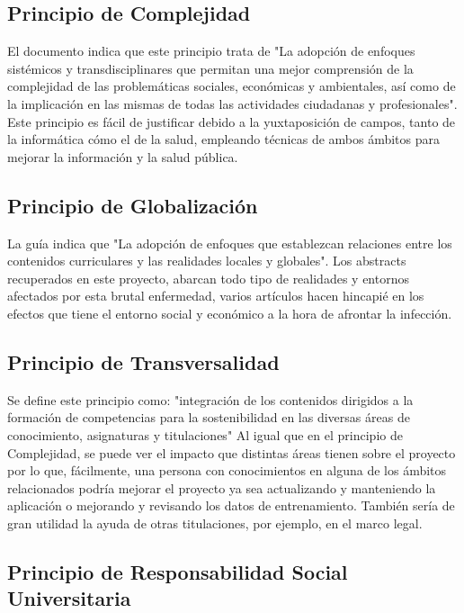 \subsection{Principio de Complejidad}

El documento indica que este principio trata de "La adopción de enfoques sistémicos y transdisciplinares que permitan una mejor comprensión de la complejidad de las problemáticas sociales, económicas y ambientales, así como de la implicación en las mismas de todas las actividades ciudadanas y
profesionales". Este principio es fácil de justificar debido a la yuxtaposición de campos, tanto de la informática cómo el de la salud, empleando técnicas de ambos ámbitos para mejorar la información y la salud pública.

\subsection{Principio de Globalización}

La guía indica que "La adopción de enfoques que establezcan relaciones entre los contenidos curriculares y las realidades locales y globales".  Los abstracts recuperados en este proyecto, abarcan todo tipo de realidades y entornos afectados por esta brutal enfermedad, varios artículos hacen hincapié en los efectos que tiene el entorno social y económico a la hora de afrontar la infección.

\subsection{Principio de Transversalidad}

Se define este principio como: "integración de los contenidos dirigidos a la formación de competencias para la sostenibilidad en las diversas áreas de conocimiento, asignaturas y titulaciones" Al igual que en el principio de Complejidad, se puede ver el impacto que distintas áreas tienen sobre el proyecto por lo que, fácilmente, una persona con conocimientos en alguna de los ámbitos relacionados podría mejorar el proyecto ya sea actualizando y manteniendo la aplicación o mejorando y revisando los datos de entrenamiento. También sería de gran utilidad la ayuda de otras titulaciones, por ejemplo, en el marco legal.

\subsection{Principio de Responsabilidad Social Universitaria}

